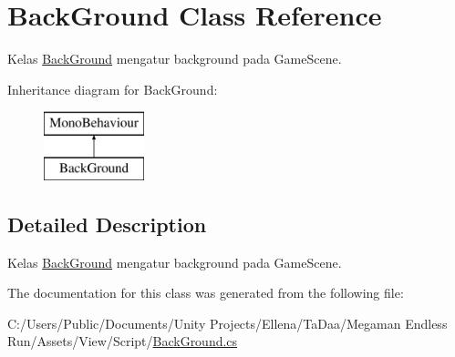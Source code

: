 \hypertarget{class_back_ground}{}\section{Back\+Ground Class Reference}
\label{class_back_ground}


Kelas \hyperlink{class_back_ground}{Back\+Ground} mengatur background pada Game\+Scene.  


Inheritance diagram for Back\+Ground\+:\begin{figure}[H]
\begin{center}
\leavevmode
\includegraphics[height=2.000000cm]{class_back_ground}
\end{center}
\end{figure}


\subsection{Detailed Description}
Kelas \hyperlink{class_back_ground}{Back\+Ground} mengatur background pada Game\+Scene. 



The documentation for this class was generated from the following file\+:\begin{DoxyCompactItemize}
\item 
C\+:/\+Users/\+Public/\+Documents/\+Unity Projects/\+Ellena/\+Ta\+Daa/\+Megaman Endless Run/\+Assets/\+View/\+Script/\hyperlink{_back_ground_8cs}{Back\+Ground.\+cs}\end{DoxyCompactItemize}
